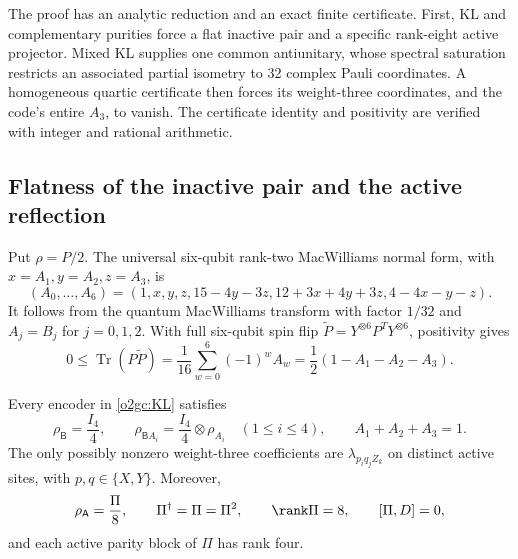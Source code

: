 The proof has an analytic reduction and an exact finite certificate.
First, KL and complementary purities force a flat inactive pair and a
specific rank-eight active projector. Mixed KL supplies one common
antiunitary, whose spectral saturation restricts an associated partial
isometry to 32 complex Pauli coordinates. A homogeneous quartic
certificate then forces its weight-three coordinates, and the code's
entire \(A_3\), to vanish. The certificate identity and positivity are
verified with integer and rational arithmetic.

\subsection{Flatness of the inactive pair and the active reflection}
\label{o2gc:subsec-flatness}

Put \(\rho=P/2\). The universal six-qubit rank-two MacWilliams normal
form, with \(x=A_1,y=A_2,z=A_3\), is
\begin{equation}
 (A_0,\ldots,A_6)=
 (1,x,y,z,15-4y-3z,12+3x+4y+3z,4-4x-y-z).
 \label{o2gc:MacWilliams}
\end{equation}
It follows from the quantum MacWilliams transform with factor \(1/32\)
and \(A_j=B_j\) for \(j=0,1,2\). With full six-qubit spin flip
\(\widetilde P=Y^{\otimes6}P^TY^{\otimes6}\), positivity gives
\begin{equation}
 0\le\operatorname{Tr}(P\widetilde P)
 =\frac1{16}\sum_{w=0}^6(-1)^wA_w
 =\frac12(1-A_1-A_2-A_3).
 \label{o2gc:shadow}
\end{equation}

\begin{lemma}
\label{o2gc:lem-flatness}
Every encoder in \eqref{o2gc:KL} satisfies
\begin{equation}
 \rho_{\mathsf B}=\frac{I_4}{4},\qquad
 \rho_{\mathsf B A_i}=\frac{I_4}{4}\otimes\rho_{A_i}
 \quad(1\le i\le4),\qquad A_1+A_2+A_3=1.
 \label{o2gc:flatness}
\end{equation}
The only possibly nonzero weight-three coefficients are
\(\lambda_{p_iq_jZ_k}\) on distinct active sites, with
\(p,q\in\{X,Y\}\). Moreover,
\begin{equation}
 \rho_{\mathsf A}=\frac{\Pi}{8},\qquad
 \Pi^\dagger=\Pi=\Pi^2,\qquad \rank\Pi=8,\qquad [\Pi,D]=0,
 \label{o2gc:active-projector}
\end{equation}
and each active parity block of \(\Pi\) has rank four.
\end{lemma}

